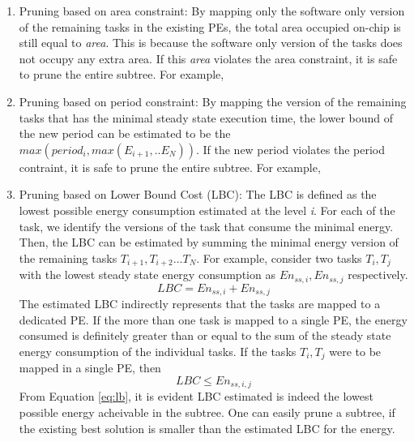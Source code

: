 \begin{enumerate}
\item Pruning based on area constraint: By mapping only the software
only version of the remaining tasks in the existing PEs, the total area
occupied on-chip is still equal to \textit{area}. This is because the
software only version of the tasks does not occupy any extra area. If
this \textit{area} violates the area constraint, it is safe to prune the
entire subtree. For example, 

\item Pruning based on period constraint: By mapping the version of the
remaining tasks that has the minimal steady state execution time, the
lower bound of the new period can be estimated to be the \begin{math}
max(period_i, max(E_{i+1},..E_{N}))\end{math}. If the new period violates
the period contraint, it is safe to prune the entire subtree. For
example,

\item Pruning based on Lower Bound Cost (LBC): The LBC is defined as the
lowest possible energy consumption estimated at the level \textit{i}. For
each of the task, we identify the versions of the task that consume the
minimal energy. Then, the LBC can be estimated by summing the minimal
energy version of the remaining tasks $T_{i+1}, T_{i+2} ... T_{N}$. For
example, consider two tasks $T_i, T_j$ with the lowest steady state
energy consumption as $En_{ss,i}, En_{ss,j}$ respectively.
\begin{equation}
LBC = En_{ss,i} + En_{ss,j}
\end{equation}
The estimated LBC indirectly represents that the tasks are mapped to a
dedicated PE. If the more than one task is mapped to a single PE, the
energy consumed is definitely greater than or equal to the sum of the
steady state energy consumption of the individual tasks. If the tasks
$T_i, T_j$ were to be mapped in a single PE, then
\begin{equation}
\label{eq:lb}
LBC \leq En_{ss,i,j}
\end{equation}
From Equation \ref{eq:lb}, it is evident LBC estimated is indeed the
lowest possible energy acheivable in the subtree. One can easily prune a
subtree, if the existing best solution is smaller than the estimated LBC
for the energy.
\end{enumerate}


